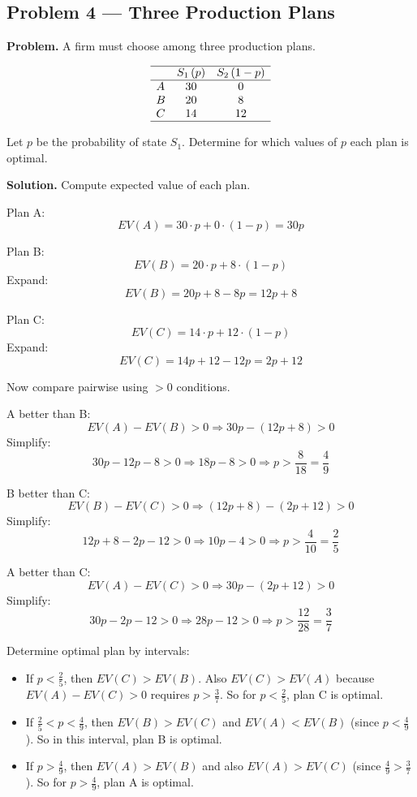 \begin{ExamProblems}
		\subsection*{Problem 4 — Three Production Plans}
		
		\textbf{Problem.}
		A firm must choose among three production plans.
		
		\[
		\begin{array}{lcc}
			\hline
			& S_1\,(p) & S_2\,(1-p) \\
			\hline
			A & 30 & 0 \\
			B & 20 & 8 \\
			C & 14 & 12 \\
			\hline
		\end{array}
		\]
		
		Let \(p\) be the probability of state \(S_1\).  
		Determine for which values of \(p\) each plan is optimal.
		
		\textbf{Solution.}
		Compute expected value of each plan.
		
		Plan A:
		\[
		EV(A)=30\cdot p + 0\cdot(1-p)=30p
		\]
		
		Plan B:
		\[
		EV(B)=20\cdot p + 8\cdot(1-p)
		\]
		Expand:
		\[
		EV(B)=20p + 8 - 8p = 12p+8
		\]
		
		Plan C:
		\[
		EV(C)=14\cdot p + 12\cdot(1-p)
		\]
		Expand:
		\[
		EV(C)=14p + 12 - 12p = 2p+12
		\]
		
		Now compare pairwise using \(>0\) conditions.
		
		A better than B:
		\[
		EV(A)-EV(B)>0 \Rightarrow 30p-(12p+8)>0
		\]
		Simplify:
		\[
		30p-12p-8>0 \Rightarrow 18p-8>0 \Rightarrow p>\frac{8}{18}=\frac{4}{9}
		\]
		
		B better than C:
		\[
		EV(B)-EV(C)>0 \Rightarrow (12p+8)-(2p+12)>0
		\]
		Simplify:
		\[
		12p+8-2p-12>0 \Rightarrow 10p-4>0 \Rightarrow p>\frac{4}{10}=\frac{2}{5}
		\]
		
		A better than C:
		\[
		EV(A)-EV(C)>0 \Rightarrow 30p-(2p+12)>0
		\]
		Simplify:
		\[
		30p-2p-12>0 \Rightarrow 28p-12>0 \Rightarrow p>\frac{12}{28}=\frac{3}{7}
		\]
		
		Determine optimal plan by intervals:
		\begin{itemize}
			\item If \(p<\frac{2}{5}\), then \(EV(C)>EV(B)\). Also \(EV(C)>EV(A)\) because \(EV(A)-EV(C)>0\) requires \(p>\frac{3}{7}\). So for \(p<\frac{2}{5}\), plan C is optimal.
			\item If \(\frac{2}{5}<p<\frac{4}{9}\), then \(EV(B)>EV(C)\) and \(EV(A)<EV(B)\) (since \(p<\frac{4}{9}\)). So in this interval, plan B is optimal.
			\item If \(p>\frac{4}{9}\), then \(EV(A)>EV(B)\) and also \(EV(A)>EV(C)\) (since \(\frac{4}{9}>\frac{3}{7}\)). So for \(p>\frac{4}{9}\), plan A is optimal.
		\end{itemize}
		

\end{ExamProblems}
